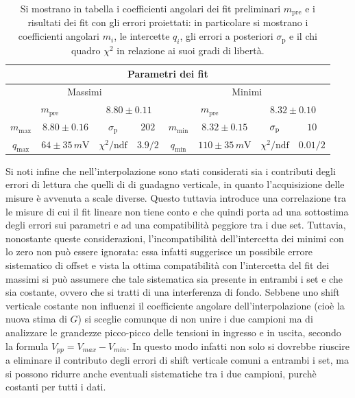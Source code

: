 \documentclass[a4paper,11pt]{article}
\begin{document}
\begin{table}[h]
\centering
\setlength{\tabcolsep}{10pt}
\begin{tabular}{ | c c | c c | c c | c c|  }
\hline
  \multicolumn{8}{|c|}{Parametri dei fit} \\
  \hline
  \multicolumn{4}{|c|}{Massimi} &
  \multicolumn{4}{c|}{Minimi} \\
  \hline
  \multicolumn{2}{|c}{$m_{\text{pre}}$} & \multicolumn{2}{c|}{$8.80 \pm 0.11$} &
  \multicolumn{2}{c}{$m_{\text{pre}}$} & \multicolumn{2}{c|}{$8.32 \pm 0.10$} \\
  $m_{\text{max}}$   &   $8.80 \pm 0.16$             &   $\sigma_{\text{p}}$              &   $ 202$   &   $m_{\text{min}}$   & $8.32 \pm 0.15 $            &  $\sigma_{\text p}$             & $10$ \\
  $q_{\text{max}}$   &   $ 64 \pm 35 \,\si{m\volt}$   &   $\chi^{2}/\text{ndf}$           &   $3.9/2$   &   $q_{\text{min}}$   & $110 \pm 35 \, \si{m\volt}$  & $\chi^{2} / \text{ndf}$        & $0.01/2$ \\
\hline
\end{tabular}
\caption{\footnotesize Si mostrano in tabella i coefficienti angolari dei fit preliminari
  $m_{\text{pre}}$ e i risultati dei fit con gli errori proiettati: in particolare si mostrano i
  coefficienti angolari $m_{i}$, le intercette $q_{i}$, gli errori a posteriori
  $\sigma_{\text{p}}$ e il chi quadro $\chi^{2}$ in relazione ai suoi gradi di libertà.}
\label{tab:fitmaxmin}
\end{table}

\noindent Si noti infine che nell'interpolazione sono stati considerati
sia i contributi degli errori di lettura che quelli di di guadagno verticale, in quanto
l'acquisizione delle misure è avvenuta a scale diverse. Questo tuttavia introduce una
correlazione tra le misure di cui il fit lineare non tiene conto e che quindi porta ad una
sottostima degli errori sui parametri e ad una compatibilità peggiore tra i due set.
Tuttavia, nonostante queste considerazioni, l'incompatibilità dell'intercetta dei minimi con
lo zero non può essere ignorata: essa infatti suggerisce un possibile errore sistematico di offset e vista la ottima compatibilità con l'intercetta del fit dei massimi si può assumere che
tale sistematica sia presente in entrambi i set e che sia costante, ovvero che si tratti di
una interferenza di fondo. Sebbene uno shift verticale costante non influenzi il coefficiente angolare dell'interpolazione (cioè la nuova stima di $G$) si sceglie comunque di non
unire i due campioni ma di analizzare le grandezze picco-picco delle tensioni in ingresso e in uscita,
secondo la formula $V_{pp}=V_{max} - V_{min}$. In questo modo infatti non solo si dovrebbe
riuscire a eliminare il contributo degli errori di shift verticale comuni a
entrambi i set, ma si possono ridurre anche eventuali sistematiche tra i due campioni, purchè
costanti per tutti i dati.\\
\end{document}
